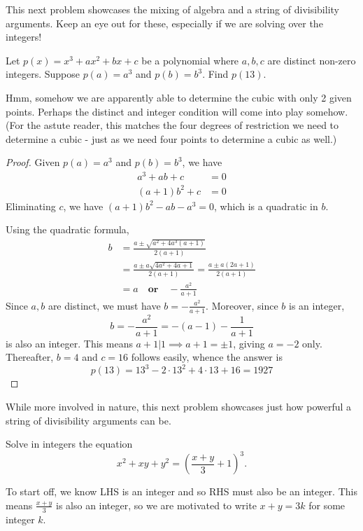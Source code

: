 \documentclass[../jarvis.tex]{subfiles}
\begin{document}
This next problem showcases the mixing of algebra and a string of divisibility arguments. Keep an eye out for these, especially if we are solving over the integers!
\begin{example}[2018 SMO(O) P9]
    Let $p(x)=x^3+ax^2+bx+c$ be a polynomial where $a,b,c$ are distinct non-zero integers. Suppose $p(a)=a^3$ and $p(b)=b^3$. Find $p(13)$.
\end{example}
Hmm, somehow we are apparently able to determine the cubic with only 2 given points. Perhaps the distinct and integer condition will come into play somehow. (For the astute reader, this matches the four degrees of restriction we need to determine a cubic - just as we need four points to determine a cubic as well.)
\begin{proof}
    Given $p(a)=a^3$ and $p(b)=b^3$, we have 
    \begin{align*}
        a^3+ab+c&=0\\
        (a+1)b^2+c&=0
    \end{align*}
    Eliminating $c$,
    we have $(a+1)b^2-ab-a^3=0$, which is a quadratic in $b$.
    
    Using the quadratic formula,
    \begin{align*}
        b&=\frac{a\pm \sqrt{a^2+4a^3(a+1)}}{2(a+1)}\\
        &=\frac{a\pm a\sqrt{4a^2+4a+1}}{2(a+1)}=\frac{a\pm a(2a+1)}{2(a+1)} \\
        &=a \quad \textbf{or} \quad -\frac{a^2}{a+1}
    \end{align*}
    Since $a,b$ are distinct, we must have $b=-\frac{a^2}{a+1}.$
    Moreover, since $b$ is an integer, 
    $$b=-\frac{a^2}{a+1}=-(a-1)-\frac{1}{a+1}$$
    is also an integer. This means $a+1|1 \implies a+1=\pm 1$, giving $a=-2$ only. Thereafter, $b=4$ and $c=16$ follows easily, whence the answer is 
    $$p(13)=13^3-2\cdot 13^2+4\cdot 13+16=\boxed{1927}$$
\end{proof}

While more involved in nature, this next problem showcases just how powerful a string of divisibility arguments can be.
\begin{example}
Solve in integers the equation
$$x^2+xy+y^2=\left(\frac{x+y}{3}+1\right)^3.$$
\end{example}
To start off, we know LHS is an integer and so RHS must also be an integer. This means $\frac{x+y}{3}$ is also an integer, so we are motivated to write $x+y=3k$ for some integer $k$.
\end{document}
